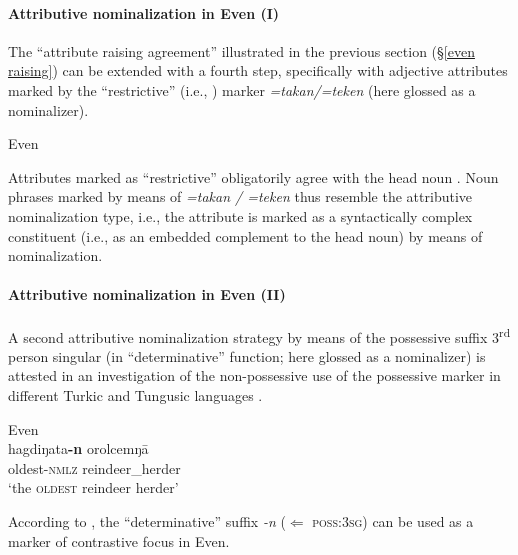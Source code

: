 \paragraph*{Attributive nominalization in Even (I)}
The “attribute raising agreement” illustrated in the previous section (\S\ref{even raising}) can be extended with a fourth step, specifically with adjective attributes marked by the “restrictive” (i.e., ) marker \textit{=takan/=teken} (here glossed as a nominalizer).%
\begin{exe}
\ex 
\rm{Even \citep[32]{malchukov1995}}
\begin{xlist}
\end{xlist}
\end{exe}
Attributes marked as “restrictive” obligatorily agree with the head noun \citep[32]{malchukov1995}. Noun phrases marked by means of \textit{=takan / =teken} thus resemble the attributive nominalization type, i.e., the attribute is marked as a syntactically complex constituent (i.e., as an embedded complement to the head noun) by means of nominalization.

\paragraph*{Attributive nominalization in Even (II)}
A second attributive nominalization strategy by means of the possessive suffix 3\textsuperscript{rd} person singular (in “determinative” function; here glossed as a nominalizer) is attested in an investigation of the non-possessive use of the possessive marker in different Turkic and Tungusic languages \citep{benzing1993b}.
\begin{exe}
\ex 
\rm{Even \citep[17–18 Footnote 58]{benzing1993b}}\\
\gll	hagdiŋata\textbf{-n} orolcemŋā\\
	oldest-\textsc{nmlz} reindeer\_herder\\
\glt	‘the \textsc{oldest} reindeer herder’
\end{exe}
According to \cite[17–18 Footnote 58]{benzing1993b}, the “determinative” suffix \textit{-n} ($\Leftarrow$ \textsc{poss:3sg}) can be used as a marker of contrastive focus in Even.

